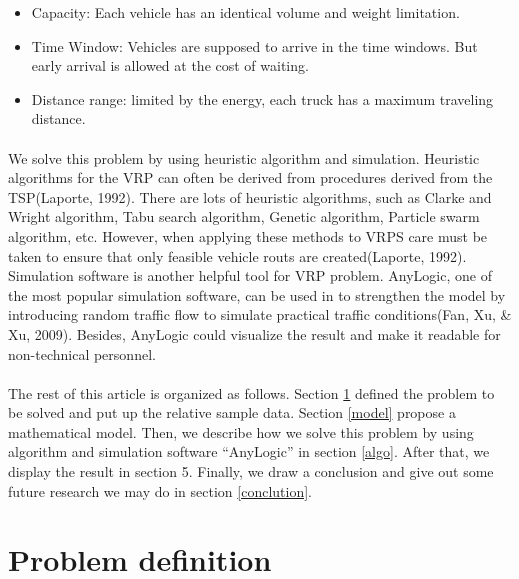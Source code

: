 \documentclass[12pt]{article}
\numberwithin{equation}{section}
\begin{document}
	\begin{itemize}
		\item Capacity: Each vehicle has an identical volume and weight limitation.\item Time Window: Vehicles are supposed to arrive in the time windows. But early arrival is allowed at the cost of waiting.\item Distance range: limited by the energy, each truck has a maximum traveling distance. 
	\end{itemize}

	\paragraph{}We solve this problem by using heuristic algorithm and simulation. Heuristic algorithms for the VRP can often be derived from procedures derived from the TSP(Laporte, 1992). There are lots of heuristic algorithms, such as Clarke and Wright algorithm, Tabu search algorithm, Genetic algorithm, Particle swarm algorithm, etc. However, when applying these methods to VRPS care must be taken to ensure that only feasible vehicle routs are created(Laporte, 1992). Simulation software is another helpful tool for VRP problem. AnyLogic, one of the most popular simulation software, can be used in to strengthen the model by introducing random traffic flow to simulate practical traffic conditions(Fan, Xu, \& Xu, 2009). Besides, AnyLogic could visualize the result and make it readable for non-technical personnel.
	
	\paragraph{}The rest of this article is organized as follows. Section \ref{problem} defined the problem to be solved and put up the relative sample data. Section \ref{model} propose a mathematical model. Then, we describe how we solve this problem by using algorithm and simulation software “AnyLogic” in section \ref{algo}. After that, we display the result in section 5. Finally, we draw a conclusion and give out some future research we may do in section \ref{conclution}.  

\section{Problem definition}\label{problem}
\end{document}
